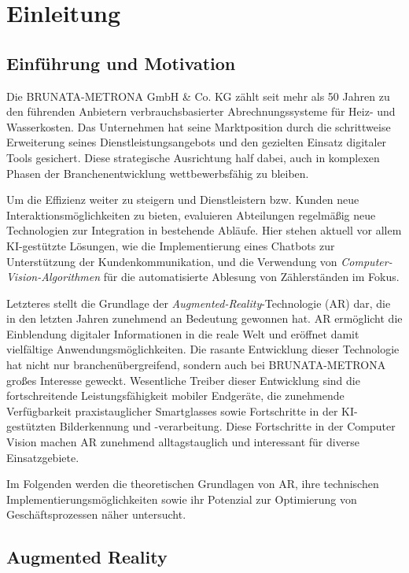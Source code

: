 \chapter{Einleitung}

\section{Einführung und Motivation}

Die BRUNATA-METRONA GmbH \& Co. KG zählt seit mehr als 50 Jahren zu den führenden Anbietern verbrauchsbasierter Abrechnungssysteme für Heiz- und Wasserkosten. Das Unternehmen hat seine Marktposition durch die schrittweise Erweiterung seines Dienstleistungsangebots und den gezielten Einsatz digitaler Tools gesichert. Diese strategische Ausrichtung half dabei, auch in komplexen Phasen der Branchenentwicklung wettbewerbsfähig zu bleiben.

Um die Effizienz weiter zu steigern und Dienstleistern bzw. Kunden neue Interaktionsmöglichkeiten zu bieten, evaluieren Abteilungen regelmäßig neue Technologien zur Integration in bestehende Abläufe. Hier stehen aktuell vor allem KI-gestützte Lösungen, wie die Implementierung eines Chatbots zur Unterstützung der Kundenkommunikation, und die Verwendung von \emph{Computer-Vision-Algorithmen} für die automatisierte Ablesung von Zählerständen im Fokus.

Letzteres stellt die Grundlage der \textit{Augmented-Reality}-Technologie (AR) dar, die in den letzten Jahren zunehmend an Bedeutung gewonnen hat. AR ermöglicht die Einblendung digitaler Informationen in die reale Welt und eröffnet damit vielfältige Anwendungsmöglichkeiten. Die rasante Entwicklung dieser Technologie hat nicht nur branchenübergreifend, sondern auch bei BRUNATA-METRONA großes Interesse geweckt. Wesentliche Treiber dieser Entwicklung sind die fortschreitende Leistungsfähigkeit mobiler Endgeräte, die zunehmende Verfügbarkeit praxistauglicher Smartglasses sowie Fortschritte in der KI-gestützten Bilderkennung und -verarbeitung. Diese Fortschritte in der Computer Vision machen AR zunehmend alltagstauglich und interessant für diverse Einsatzgebiete. \cite{verma2022advances, boulanger2024applications, doerner2022virtual}

Im Folgenden werden die theoretischen Grundlagen von AR, ihre technischen Implementierungsmöglichkeiten sowie ihr Potenzial zur Optimierung von Geschäftsprozessen näher untersucht.

\section{Augmented Reality}

